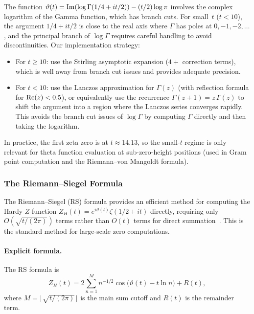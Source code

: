 \begin{remark}\label{rem:branch}
The function $\vartheta(t) = \operatorname{Im}(\log\Gamma(1/4 + it/2)) - (t/2)\log\pi$ involves the
complex logarithm of the Gamma function, which has branch cuts. For small~$t$ ($t < 10$),
the argument $1/4 + it/2$ is close to the real axis where $\Gamma$ has poles at
$0, -1, -2, \ldots$, and the principal branch of $\log\Gamma$ requires careful handling
to avoid discontinuities. Our implementation strategy:
\begin{itemize}
  \item For $t \ge 10$: use the Stirling asymptotic expansion ($4+$ correction terms),
        which is well away from branch cut issues and provides adequate precision.
  \item For $t < 10$: use the Lanczos approximation for $\Gamma(z)$ (with reflection
        formula for $\operatorname{Re}(z) < 0.5$), or equivalently use the recurrence
        $\Gamma(z{+}1) = z\,\Gamma(z)$ to shift the argument into a region where the
        Lanczos series converges rapidly. This avoids the branch cut issues of
        $\log\Gamma$ by computing $\Gamma$ directly and then taking the logarithm.
\end{itemize}
In practice, the first zeta zero is at $t \approx 14.13$, so the small-$t$ regime is
only relevant for theta function evaluation at sub-zero-height positions (used in Gram
point computation and the Riemann--von Mangoldt formula).
\end{remark}


\subsubsection{The Riemann--Siegel Formula}
\label{sec:rs}

The Riemann--Siegel (RS) formula provides an efficient method for computing the Hardy
$Z$-function $Z_H(t) = e^{i\vartheta(t)}\zeta(1/2 + it)$ directly, requiring only
$O(\sqrt{t/(2\pi)})$ terms rather than $O(t)$ terms for direct
summation~\cite{titchmarsh1986,gabcke1979}. This is the standard method for large-scale
zero computations.

\paragraph{Explicit formula.}
The RS formula is
\begin{equation}\label{eq:rs-formula}
  Z_H(t) = 2\sum_{n=1}^{M} n^{-1/2}\cos\bigl(\vartheta(t) - t\ln n\bigr) + R(t),
\end{equation}
where $M = \lfloor\sqrt{t/(2\pi)}\rfloor$ is the main sum cutoff and $R(t)$ is the
remainder term.

